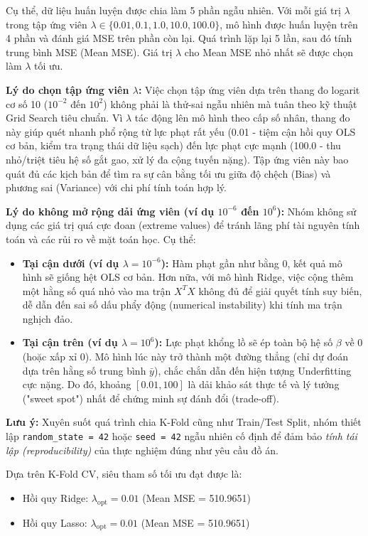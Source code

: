 Cụ thể, dữ liệu huấn luyện được chia làm 5 phần ngẫu nhiên. Với mỗi giá trị $\lambda$ trong tập ứng viên $\lambda \in \{0.01, 0.1, 1.0, 10.0, 100.0\}$, mô hình được huấn luyện trên 4 phần và đánh giá MSE trên phần còn lại. Quá trình lặp lại 5 lần, sau đó tính trung bình MSE (Mean MSE). Giá trị $\lambda$ cho Mean MSE nhỏ nhất sẽ được chọn làm $\lambda$ tối ưu.

\textbf{Lý do chọn tập ứng viên $\lambda$:} Việc chọn tập ứng viên dựa trên thang đo logarit cơ số 10 ($10^{-2}$ đến $10^2$) không phải là thử-sai ngẫu nhiên mà tuân theo kỹ thuật Grid Search tiêu chuẩn. Vì $\lambda$ tác động lên mô hình theo cấp số nhân, thang đo này giúp quét nhanh phổ rộng từ lực phạt rất yếu (0.01 - tiệm cận hồi quy OLS cơ bản, kiểm tra trạng thái dữ liệu sạch) đến lực phạt cực mạnh (100.0 - thu nhỏ/triệt tiêu hệ số gắt gao, xử lý đa cộng tuyến nặng). Tập ứng viên này bao quát đủ các kịch bản để tìm ra sự cân bằng tối ưu giữa độ chệch (Bias) và phương sai (Variance) với chi phí tính toán hợp lý.

\textbf{Lý do không mở rộng dải ứng viên (ví dụ $10^{-6}$ đến $10^6$):} Nhóm không sử dụng các giá trị quá cực đoan (extreme values) để tránh lãng phí tài nguyên tính toán và các rủi ro về mặt toán học. Cụ thể:
\begin{itemize}
    \item \textbf{Tại cận dưới (ví dụ $\lambda = 10^{-6}$):} Hàm phạt gần như bằng $0$, kết quả mô hình sẽ giống hệt OLS cơ bản. Hơn nữa, với mô hình Ridge, việc cộng thêm một hằng số quá nhỏ vào ma trận $X^TX$ không đủ để giải quyết tính suy biến, dễ dẫn đến sai số dấu phẩy động (numerical instability) khi tính ma trận nghịch đảo.
    \item \textbf{Tại cận trên (ví dụ $\lambda = 10^6$):} Lực phạt khổng lồ sẽ ép toàn bộ hệ số $\beta$ về $0$ (hoặc xấp xỉ $0$). Mô hình lúc này trở thành một đường thẳng (chỉ dự đoán dựa trên hằng số trung bình $\bar{y}$), chắc chắn dẫn đến hiện tượng Underfitting cực nặng. Do đó, khoảng $[0.01, 100]$ là dải khảo sát thực tế và lý tưởng ("sweet spot") nhất để chứng minh sự đánh đổi (trade-off).
\end{itemize}

\textbf{Lưu ý:} Xuyên suốt quá trình chia K-Fold cũng như Train/Test Split, nhóm thiết lập \texttt{random\_state = 42} hoặc \texttt{seed = 42} ngẫu nhiên cố định để đảm bảo \textit{tính tái lập (reproducibility)} của thực nghiệm đúng như yêu cầu đồ án.

Dựa trên K-Fold CV, siêu tham số tối ưu đạt được là:
\begin{itemize}
    \item Hồi quy Ridge: $\lambda_{\text{opt}} = 0.01$ (Mean MSE = 510.9651)
    \item Hồi quy Lasso: $\lambda_{\text{opt}} = 0.01$ (Mean MSE = 510.9651)
\end{itemize}
